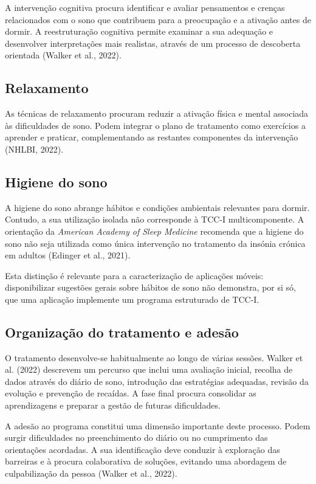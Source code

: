 A intervenção cognitiva procura identificar e avaliar pensamentos e crenças relacionados com o sono que contribuem para a preocupação e a ativação antes de dormir. A reestruturação cognitiva permite examinar a sua adequação e desenvolver interpretações mais realistas, através de um processo de descoberta orientada (Walker et al., 2022).

\subsection*{Relaxamento}

As técnicas de relaxamento procuram reduzir a ativação física e mental associada às dificuldades de sono. Podem integrar o plano de tratamento como exercícios a aprender e praticar, complementando as restantes componentes da intervenção (NHLBI, 2022).

\subsection*{Higiene do sono}

A higiene do sono abrange hábitos e condições ambientais relevantes para dormir. Contudo, a sua utilização isolada não corresponde à TCC-I multicomponente. A orientação da \textit{American Academy of Sleep Medicine} recomenda que a higiene do sono não seja utilizada como única intervenção no tratamento da insónia crónica em adultos (Edinger et al., 2021).

Esta distinção é relevante para a caracterização de aplicações móveis: disponibilizar sugestões gerais sobre hábitos de sono não demonstra, por si só, que uma aplicação implemente um programa estruturado de TCC-I.

\subsection{Organização do tratamento e adesão}

O tratamento desenvolve-se habitualmente ao longo de várias sessões. Walker et al. (2022) descrevem um percurso que inclui uma avaliação inicial, recolha de dados através do diário de sono, introdução das estratégias adequadas, revisão da evolução e prevenção de recaídas. A fase final procura consolidar as aprendizagens e preparar a gestão de futuras dificuldades.

A adesão ao programa constitui uma dimensão importante deste processo. Podem surgir dificuldades no preenchimento do diário ou no cumprimento das orientações acordadas. A sua identificação deve conduzir à exploração das barreiras e à procura colaborativa de soluções, evitando uma abordagem de culpabilização da pessoa (Walker et al., 2022).


